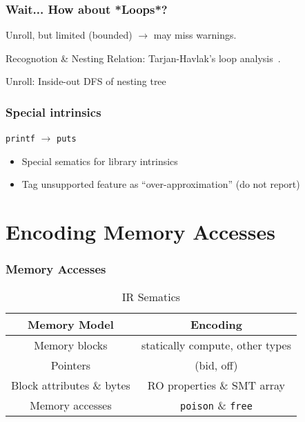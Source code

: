 \documentclass[aspectratio=169]{ctexbeamer}
\begin{document}
\begin{frame}
    \frametitle{Wait... How about *Loops*?}

    Unroll, but limited (bounded) $\rightarrow$ may miss warnings.

    Recognotion \& Nesting Relation: Tarjan-Havlak's loop analysis~\cite{Havlak1997NestingOR}.

    Unroll: Inside-out DFS of nesting tree

\end{frame}


\begin{frame}
    \frametitle{Special intrinsics}
    \begin{center}
        \texttt{printf} $\rightarrow$ \texttt{puts}
    \end{center}

    \begin{itemize}
        \pause
        \item Special sematics for library intrinsics
              \pause
        \item Tag unsupported feature as ``over-approximation'' (do not report)
    \end{itemize}

\end{frame}


\section{Encoding Memory Accesses}

\begin{frame}
    \frametitle{Memory Accesses}

    \begin{table}
        \centering
        \caption{IR Sematics}
        \begin{tabular}{cc}
            \toprule
            \textbf{Memory Model}     & \textbf{Encoding}                \\
            \midrule
            Memory blocks             & statically compute, other types  \\
            Pointers                  & (bid, off)                       \\
            Block attributes \& bytes & RO properties \& SMT array       \\
            Memory accesses           & \texttt{poison} \& \texttt{free} \\

            \bottomrule
        \end{tabular}
    \end{table}

\end{frame}
\end{document}

